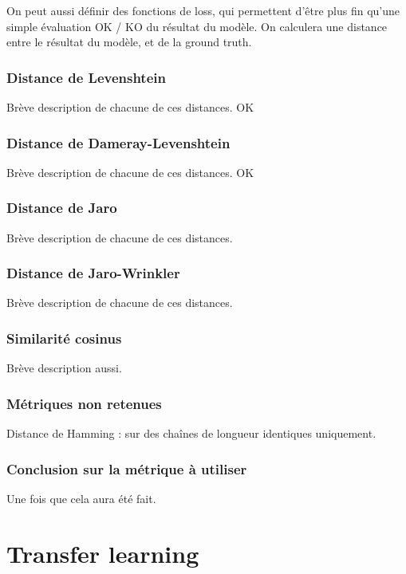         On peut aussi définir des fonctions de loss, qui permettent d'être plus fin qu'une simple évaluation OK / KO du résultat du modèle.
        On calculera une distance entre le résultat du modèle, et de la ground truth.

            \subsection{Distance de Levenshtein}

            Brève description de chacune de ces distances. OK

            \subsection{Distance de Dameray-Levenshtein}

            Brève description de chacune de ces distances. OK
            
            \subsection{Distance de Jaro}
            Brève description de chacune de ces distances.

            \subsection{Distance de Jaro-Wrinkler}
            Brève description de chacune de ces distances.

            \subsection{Similarité cosinus}
            Brève description aussi.

            \subsection{Métriques non retenues}
            Distance de Hamming : sur des chaînes de longueur identiques uniquement.


            \subsection{Conclusion sur la métrique à utiliser}
            Une fois que cela aura été fait.

    \chapter{Transfer learning}
        
